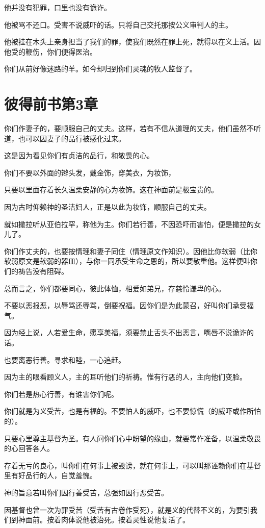\documentclass[12pt,oneside]{book}
\begin{document}
他并没有犯罪，口里也没有诡诈。

他被骂不还口。受害不说威吓的话。只将自己交托那按公义审判人的主。

他被挂在木头上亲身担当了我们的罪，使我们既然在罪上死，就得以在义上活。因他受的鞭伤，你们便得医治。

你们从前好像迷路的羊。如今却归到你们灵魂的牧人监督了。

\chapter{彼得前书第3章}
你们作妻子的，要顺服自己的丈夫。这样，若有不信从道理的丈夫，他们虽然不听道，也可以因妻子的品行被感化过来。

这是因为看见你们有贞洁的品行，和敬畏的心。

你们不要以外面的辫头发，戴金饰，穿美衣，为妆饰，

只要以里面存着长久温柔安静的心为妆饰。这在神面前是极宝贵的。

因为古时仰赖神的圣洁妇人，正是以此为妆饰，顺服自己的丈夫。

就如撒拉听从亚伯拉罕，称他为主。你们若行善，不因恐吓而害怕，便是撒拉的女儿了。

你们作丈夫的，也要按情理和妻子同住（情理原文作知识）。因他比你软弱（比你软弱原文是软弱的器皿），与你一同承受生命之恩的，所以要敬重他。这样便叫你们的祷告没有阻碍。

总而言之，你们都要同心，彼此体恤，相爱如弟兄，存慈怜谦卑的心。

不要以恶报恶，以辱骂还辱骂，倒要祝福。因你们是为此蒙召，好叫你们承受福气。

因为经上说，人若爱生命，愿享美福，须要禁止舌头不出恶言，嘴唇不说诡诈的话。

也要离恶行善。寻求和睦，一心追赶。

因为主的眼看顾义人，主的耳听他们的祈祷。惟有行恶的人，主向他们变脸。

你们若是热心行善，有谁害你们呢。

你们就是为义受苦，也是有福的。不要怕人的威吓，也不要惊慌（的威吓或作所怕的）。

只要心里尊主基督为圣。有人问你们心中盼望的缘由，就要常作准备，以温柔敬畏的心回答各人。

存着无亏的良心，叫你们在何事上被毁谤，就在何事上，可以叫那诬赖你们在基督里有好品行的人，自觉羞愧。

神的旨意若叫你们因行善受苦，总强如因行恶受苦。

因基督也曾一次为罪受苦（受苦有古卷作受死），就是义的代替不义的，为要引我们到神面前。按着肉体说他被治死。按着灵性说他复活了。
\end{document}
